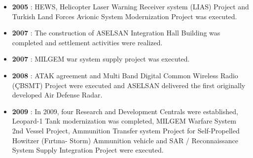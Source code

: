 \begin{itemize}
\item \textbf{ 2005 } : HEWS, Helicopter Laser Warning Receiver system (LIAS) Project and Turkish Land Forces Avionic System Modernization Project was executed.
\item \textbf{ 2007 } : The construction of ASELSAN Integration Hall Building was completed and settlement activities were realized.
\item \textbf{ 2007 } : MILGEM war system supply project was executed.
\item \textbf{ 2008 } : ATAK agreement and Multi Band Digital Common Wireless Radio (ÇBSMT) Project were executed and ASELSAN delivered the first originally developed Air Defense Radar.
\item \textbf{ 2009 } : In 2009, four Research and Development Centrals were established, Leopard-1 Tank modernization was completed, MILGEM Warfare System 2nd Vessel Project, Ammunition Transfer system Project for Self-Propelled Howitzer (Fırtına- Storm) Ammunition vehicle and SAR / Reconnaissance System Supply Integration Project were executed.

\end{itemize}
